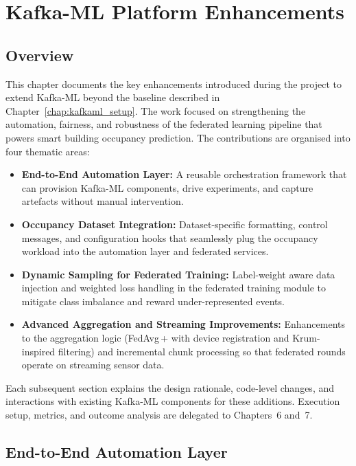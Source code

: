 \chapter{Kafka-ML Platform Enhancements}

\section{Overview}

This chapter documents the key enhancements introduced during the project to extend Kafka-ML beyond the baseline described in Chapter~\ref{chap:kafkaml_setup}. The work focused on strengthening the automation, fairness, and robustness of the federated learning pipeline that powers smart building occupancy prediction. The contributions are organised into four thematic areas:

\begin{itemize}
    \item \textbf{End-to-End Automation Layer:} A reusable orchestration framework that can provision Kafka-ML components, drive experiments, and capture artefacts without manual intervention.
    \item \textbf{Occupancy Dataset Integration:} Dataset-specific formatting, control messages, and configuration hooks that seamlessly plug the occupancy workload into the automation layer and federated services.
    \item \textbf{Dynamic Sampling for Federated Training:} Label-weight aware data injection and weighted loss handling in the federated training module to mitigate class imbalance and reward under-represented events.
    \item \textbf{Advanced Aggregation and Streaming Improvements:} Enhancements to the aggregation logic (FedAvg\,+ with device registration and Krum-inspired filtering) and incremental chunk processing so that federated rounds operate on streaming sensor data.
\end{itemize}

Each subsequent section explains the design rationale, code-level changes, and interactions with existing Kafka-ML components for these additions. Execution setup, metrics, and outcome analysis are delegated to Chapters~6 and~7.

\section{End-to-End Automation Layer}
\label{sec:automation_layer}

